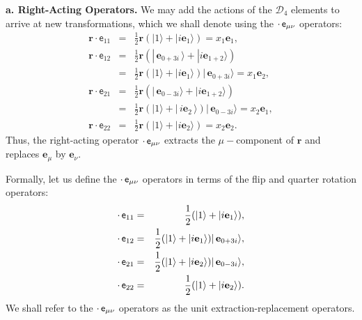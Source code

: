 \documentclass[11pt,twocolumn]{article}
\begin{document}
\textbf{a.  Right-Acting Operators.}  We may add the actions of the $\mathcal D_4$ elements to arrive at new transformations, which we shall denote using the $\cdot\,\textsf e_{\mu\nu}$ operators:
\begin{eqnarray}
\label{eq:r e_11 is x_1 e_1}
\mathbf r\cdot\textsf{e}_{11}&=&\frac{1}{2}\mathbf r(|1\rangle+|i\mathbf e_1\rangle)=x_1\mathbf e_1,\\
\label{eq:r e_12 is x_1 e_2}
\mathbf r\cdot\textsf{e}_{12}&=&\frac{1}{2}\mathbf r(|\,\mathbf e_{0+3i}\,\rangle+|i\mathbf e_{1+2}\rangle)\nonumber\\
&=&\frac{1}{2}\mathbf r(|1\rangle+|i\mathbf e_1\rangle)|\,\mathbf e_{0+3i}\rangle=x_1\mathbf e_2,\\
\label{eq:r e_21 is x_2 e_1}
\mathbf r\cdot\textsf{e}_{21}&=&\frac{1}{2}\mathbf r(|\,\mathbf e_{0-3i}\rangle+|i\mathbf e_{1+2}\rangle)\nonumber\\
&=&\frac{1}{2}\mathbf r(|1\rangle+|\,i\mathbf e_2\,\rangle)|\,\mathbf e_{0-3i}\rangle=x_2\mathbf e_1,\\
\label{eq:r e_22 is x_2 e_2}
\mathbf r\cdot\textsf{e}_{22}&=&\frac{1}{2}\mathbf r(|1\rangle+|i\mathbf e_2\rangle)=x_2\mathbf e_2.
\end{eqnarray}
Thus, the right-acting operator $\cdot\,\textsf e_{\mu\nu}$ extracts the $\mu-$component of $\mathbf r$ and replaces $\mathbf e_\mu$ by $\mathbf e_\nu$.

Formally, let us define the $\cdot\,\textsf e_{\mu\nu}$ operators in terms of the flip and quarter rotation operators:
\begin{eqnarray}
\label{eq:e_11 is half 1 + ie_1 right}
\cdot\,\textsf e_{11}&=&\frac{1}{2}(|1\rangle+|i\mathbf e_1\rangle),\\
\label{eq:e_12 is half 1 + ie_1 times e_0+3i right}
\cdot\,\textsf e_{12}&=&\frac{1}{2}(|1\rangle+|i\mathbf e_1\rangle)|\,\mathbf e_{0+3i}\rangle,\\
\label{eq:e_21 is half 1 + ie_2 times e_0-3i right}
\cdot\,\textsf e_{21}&=&\frac{1}{2}(|1\rangle+|i\mathbf e_2\rangle)|\,\mathbf e_{0-3i}\rangle,\\
\label{eq:e_22 is half 1 + ie_2 right}
\cdot\,\textsf e_{22}&=&\frac{1}{2}(|1\rangle+|i\mathbf e_2\rangle).
\end{eqnarray}
We shall refer to the $\cdot\,\textsf e_{\mu\nu}$ operators as the unit extraction-replacement operators.
\end{document}
